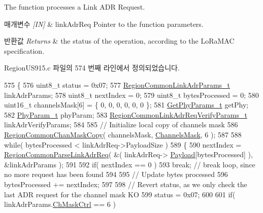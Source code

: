 The function processes a Link A\+DR Request. 


\begin{DoxyParams}{매개변수}
{\em \mbox{[}\+I\+N\mbox{]}} & link\+Adr\+Req Pointer to the function parameters.\\
\hline
\end{DoxyParams}

\begin{DoxyRetVals}{반환값}
{\em Returns} & the status of the operation, according to the Lo\+Ra\+M\+AC specification. \\
\hline
\end{DoxyRetVals}


Region\+U\+S915.\+c 파일의 574 번째 라인에서 정의되었습니다.


\begin{DoxyCode}
575 \{
576     uint8\_t status = 0x07;
577     \mbox{\hyperlink{structs_region_common_link_adr_params}{RegionCommonLinkAdrParams\_t}} linkAdrParams;
578     uint8\_t nextIndex = 0;
579     uint8\_t bytesProcessed = 0;
580     uint16\_t channelsMask[6] = \{ 0, 0, 0, 0, 0, 0 \};
581     \mbox{\hyperlink{structs_get_phy_params}{GetPhyParams\_t}} getPhy;
582     \mbox{\hyperlink{unionu_phy_param}{PhyParam\_t}} phyParam;
583     \mbox{\hyperlink{structs_region_common_link_adr_req_verify_params}{RegionCommonLinkAdrReqVerifyParams\_t}} linkAdrVerifyParams;
584 
585     \textcolor{comment}{// Initialize local copy of channels mask}
586     \mbox{\hyperlink{group___r_e_g_i_o_n_c_o_m_m_o_n_ga95f5199d490113269fae7f2e0569e9a0}{RegionCommonChanMaskCopy}}( channelsMask, \mbox{\hyperlink{_region_u_s915_8c_a2188957b5ca6af8092154d7ccbfa5757}{ChannelsMask}}, 6 );
587 
588     \textcolor{keywordflow}{while}( bytesProcessed < linkAdrReq->PayloadSize )
589     \{
590         nextIndex = \mbox{\hyperlink{group___r_e_g_i_o_n_c_o_m_m_o_n_ga8403c78482dbb901014dba48b75d78e8}{RegionCommonParseLinkAdrReq}}( &( linkAdrReq->
      \mbox{\hyperlink{structs_link_adr_req_params_a3dfbfe76c8f3bd25765750487b815147}{Payload}}[bytesProcessed] ), &linkAdrParams );
591 
592         \textcolor{keywordflow}{if}( nextIndex == 0 )
593             \textcolor{keywordflow}{break}; \textcolor{comment}{// break loop, since no more request has been found}
594 
595         \textcolor{comment}{// Update bytes processed}
596         bytesProcessed += nextIndex;
597 
598         \textcolor{comment}{// Revert status, as we only check the last ADR request for the channel mask KO}
599         status = 0x07;
600 
601         \textcolor{keywordflow}{if}( linkAdrParams.\mbox{\hyperlink{structs_region_common_link_adr_params_ac5e1891f30a172b2ce39bc3498e1843d}{ChMaskCtrl}} == 6 )

\end{DoxyCode}
